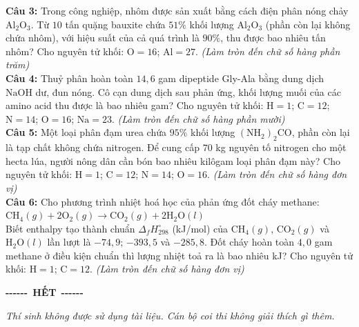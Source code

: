 \documentclass[12pt,a4paper]{article}
\begin{document}
\noindent \textbf{Câu 3:} Trong công nghiệp, nhôm được sản xuất bằng cách điện phân nóng chảy $\text{Al}_2\text{O}_3$. Từ $10$ tấn quặng bauxite chứa $51\%$ khối lượng $\text{Al}_2\text{O}_3$ (phần còn lại không chứa nhôm), với hiệu suất của cả quá trình là $90\%$, thu được bao nhiêu tấn nhôm? Cho nguyên tử khối: $\text{O} = 16$; $\text{Al} = 27$. \textit{(Làm tròn đến chữ số hàng phần trăm)}\\

\noindent \textbf{Câu 4:} Thuỷ phân hoàn toàn $14{,}6$ gam dipeptide Gly-Ala bằng dung dịch $\text{NaOH}$ dư, đun nóng. Cô cạn dung dịch sau phản ứng, khối lượng muối của các amino acid thu được là bao nhiêu gam? Cho nguyên tử khối: $\text{H} = 1$; $\text{C} = 12$; $\text{N} = 14$; $\text{O} = 16$; $\text{Na} = 23$. \textit{(Làm tròn đến chữ số hàng phần mười)}\\

\noindent \textbf{Câu 5:} Một loại phân đạm urea chứa $95\%$ khối lượng $(\text{NH}_2)_2\text{CO}$, phần còn lại là tạp chất không chứa nitrogen. Để cung cấp $70$ kg nguyên tố nitrogen cho một hecta lúa, người nông dân cần bón bao nhiêu kilôgam loại phân đạm này? Cho nguyên tử khối: $\text{H} = 1$; $\text{C} = 12$; $\text{N} = 14$; $\text{O} = 16$. \textit{(Làm tròn đến chữ số hàng đơn vị)}\\

\noindent \textbf{Câu 6:} Cho phương trình nhiệt hoá học của phản ứng đốt cháy methane:\\
$\text{CH}_4(g) + 2\text{O}_2(g) \longrightarrow \text{CO}_2(g) + 2\text{H}_2\text{O}(l)$\\
Biết enthalpy tạo thành chuẩn $\Delta_f H^{\circ}_{298}$ (kJ/mol) của $\text{CH}_4(g)$, $\text{CO}_2(g)$ và $\text{H}_2\text{O}(l)$ lần lượt là $-74{,}9$; $-393{,}5$ và $-285{,}8$. Đốt cháy hoàn toàn $4{,}0$ gam methane ở điều kiện chuẩn thì lượng nhiệt toả ra là bao nhiêu kJ? Cho nguyên tử khối: $\text{H} = 1$; $\text{C} = 12$. \textit{(Làm tròn đến chữ số hàng đơn vị)}\\\vspace{0.6cm}
\begin{center}
{\bfseries -{}-{}-{}-{}-{}-}\ \textbf{HẾT}\ {\bfseries -{}-{}-{}-{}-{}-}
\end{center}
\vspace{0.15cm}
{\small\itshape
Thí sinh không được sử dụng tài liệu. Cán bộ coi thi không giải thích gì thêm.}
\end{document}
